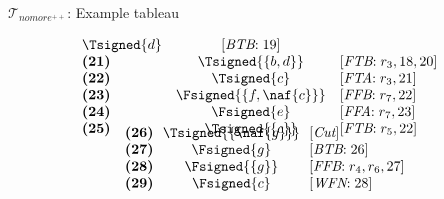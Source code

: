 \begin{frame}{$\mathcal{T}_{\textit{nomore}^{++}}$: Example tableau}
\begin{center}
\begin{minipage}[t]{16cm}
\begin{minipage}[t]{6cm}
\[\begin{array}{lcl}
  \Tsigned{d}                                      &
  [\textit{BTB}{:}\;\text{19}]                     \\
\textbf{(21)}                                      &
  \Tsigned{\{b,d\}}                                &
  [\textit{FTB}{:}\;r_3, \text{18}, \text{20}]     \\
\textbf{(22)}                                      &
  \Tsigned{c}                                      &
  [\textit{FTA}{:}\;r_3, \text{21}]                \\
\textbf{(23)}                                      &
  \Fsigned{\{f,\naf{c}\}}                   &
  [\textit{FFB}{:}\;r_7, \text{22}]                \\
\textbf{(24)}                                      &
  \Fsigned{e}                                      &
  [\textit{FFA}{:}\;r_7, \text{23}]                \\
\textbf{(25)}                                      &
  \Tsigned{\{c\}}                                  &
  [\textit{FTB}{:}\;r_5, \text{22}]
\vspace{-0.7cm}
\end{array}
\]
%
\begin{minipage}[t]{1cm}
\[
\hspace{0.25cm}
\begin{array}{l@{~~}c@{~~}l}
\textbf{(26)}                                      &
  \Tsigned{\{\naf{g}\}}                     &
  [\textit{Cut}]                                   \\
\textbf{(27)}                                      &
  \Fsigned{g}                                      &
  [\textit{BTB}{:}\;\text{26}]                     \\
\textbf{(28)}                                      & \hspace{-0.1cm}
  \Fsigned{\{g\}}                                  \hspace{-0.1cm} &
  [\textit{FFB}{:}\;r_4, r_6, \text{27}]           \\
\textbf{(29)}                                      &
  \Fsigned{c}                                      &
  [\textit{WFN}{:}\;\text{28}]
\end{array}
\]
\end{minipage}
%
\begin{minipage}[t]{2cm}
\[
\hspace{2.75cm}
\begin{array}{l@{~~}c@{~~}l}

\end{array}\]
\end{minipage}
\end{minipage}
\end{minipage}
\end{center}
\end{frame}
